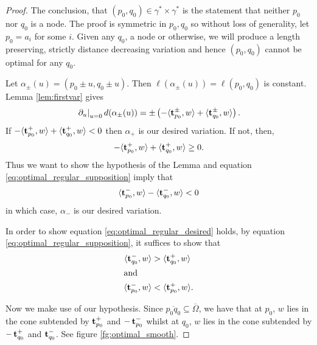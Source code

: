 \documentclass[12pt]{amsart}
\begin{document}
\begin{proof}

The conclusion, that \((p_0, q_0) \in \gamma^{\ast} \times \gamma^{\ast}\) is the statement that neither \(p_0\) nor \(q_0\) is a node. The proof is symmetric in \(p_0, q_0\) so without loss of generality, let \(p_0 = a_i\) for some \(i\). Given any \(q_0\), a node or otherwise, we will produce a length preserving, strictly distance decreasing variation and hence \((p_0, q_0)\) cannot be optimal for any \(q_0\).

Let \(\alpha_{\pm} (u) = (p_0 \pm u, q_0 \pm u)\). Then \(\ell(\alpha_{\pm} (u)) = \ell(p_0, q_0)\) is constant. Lemma \ref{lem:firstvar} gives
\[
\left.\partial_u\right|_{u=0} d (\alpha_{\pm} (u)) = \pm \left(-\langle{\operatorname{\mathbf{t}}^{\pm}_{p_0}},{w}\rangle + \langle{\operatorname{\mathbf{t}}^{\pm}_{q_0}},{w}\rangle\right).
\]
If \(-\langle{\operatorname{\mathbf{t}}_{p_0}^+},{w}\rangle + \langle{\operatorname{\mathbf{t}}_{q_0}^+},{w}\rangle < 0\) then $\alpha_+$ is our desired variation. If not, then,
\begin{equation}
\label{eq:optimal_regular_supposition}
-\langle{\operatorname{\mathbf{t}}_{p_0}^+},{w}\rangle + \langle{\operatorname{\mathbf{t}}_{q_0}^+},{w}\rangle \geq 0.
\end{equation}
Thus we want to show the hypothesis of the Lemma and equation \eqref{eq:optimal_regular_supposition} imply that
\begin{equation}
\label{eq:optimal_regular_desired}
\langle{\operatorname{\mathbf{t}}_{p_0}^-},{w}\rangle - \langle{\operatorname{\mathbf{t}}_{q_0}^-},{w}\rangle < 0
\end{equation}
in which case, $\alpha_-$ is our desired variation.

In order to show equation \eqref{eq:optimal_regular_desired} holds, by equation \eqref{eq:optimal_regular_supposition}, it suffices to show that
\begin{align}
\label{eq:optimal_regular_q}
\langle{\operatorname{\mathbf{t}}_{q_0}^-},{w}\rangle &> \langle{\operatorname{\mathbf{t}}_{q_0}^+},{w}\rangle \\
\intertext{and}
\label{eq:optimal_regular_p}
\langle{\operatorname{\mathbf{t}}_{p_0}^-},{w}\rangle &< \langle{\operatorname{\mathbf{t}}_{p_0}^+ },{w}\rangle.
\end{align}

Now we make use of our hypothesis. Since \(\overline{p_0q_0} \subseteq \overline{\Omega}\), we have that at \(p_0\), \(w\) lies in the cone subtended by \(\operatorname{\mathbf{t}}_{p_0}^+\) and \(-\operatorname{\mathbf{t}}_{p_0}^-\) whilst at \(q_0\), \(w\) lies in the cone subtended by \(-\operatorname{\mathbf{t}}_{q_0}^+\) and \(\operatorname{\mathbf{t}}_{q_0}^-\). See figure \ref{fg:optimal_smooth}.


\end{proof}
\end{document}
